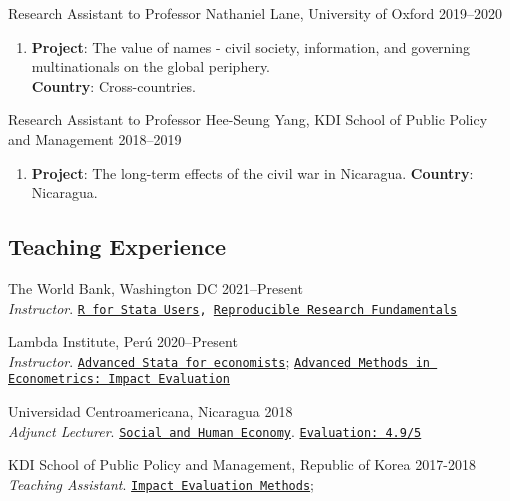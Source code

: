 \documentclass[a4paper, 10pt]{article}
\renewenvironment{itemize}{
  \begin{list}{}
    { \setlength{\itemsep}{5pt}
      \setlength{\parsep}{0pt}
      \setlength{\topsep}{0pt}
      \setlength{\leftmargin}{0em} } }{
  \end{list}}
\begin{document}
\begin{itemize}
  \item Research Assistant to Professor Nathaniel Lane, University of Oxford \hfill 2019--2020  
  \begin{enumerate}[leftmargin=10pt, label={}, nosep]  
    \item {\small \textbf{Project}: The value of names - civil society, information, and governing multinationals on the global periphery. \\ \textbf{Country}: Cross-countries.}
  \end{enumerate}
  \item Research Assistant to Professor Hee-Seung Yang, KDI School of Public Policy and Management \hfill 2018--2019  
  \begin{enumerate}[leftmargin=10pt, label={}, nosep]  
    \item {\small \textbf{Project}: The long-term effects of the civil war in Nicaragua. \newline \textbf{Country}: Nicaragua.}
  \end{enumerate}
\end{itemize}

\subsection*{Teaching Experience}
\begin{itemize}
  \item The World Bank, Washington DC \hfill 2021--Present \\  {\small \emph{Instructor}.} \texttt{\href{https://github.com/worldbank/dime-r-training}{R for Stata Users}, \href{https://github.com/dime-worldbank/rrf-course}{\texttt{Reproducible Research Fundamentals}}}

  \item Lambda Institute, Perú \hfill 2020--Present \\ {\small \emph{Instructor}.} \texttt{\href{https://github.com/lambda-stata/course-materials}{Advanced Stata for economists}}; \href{https://github.com/lambda-stata/econometria-avanzada}{\texttt{Advanced Methods in Econometrics: Impact Evaluation}}
 
  \item Universidad Centroamericana, Nicaragua \hfill 2018 \\ {\small \emph{Adjunct Lecturer}.} \texttt{\href{https://github.com/econsoc-uca}{Social and Human Economy}}. \texttt{\href{https://rrmaximiliano.github.io/docs/evaluation-esh.pdf}{Evaluation: 4.9/5}}
  
  \item KDI School of Public Policy and Management, Republic of Korea \hfill 2017-2018 \\ {\small \emph{Teaching Assistant}.} \texttt{\href{https://www.dropbox.com/home/teaching_materials/kdischool/spring_2018_impact_evaluation}{Impact Evaluation Methods}}; \texttt{\color{darkblue}{Foundations of Sustainable Development}}
\end{itemize}
\end{document}
